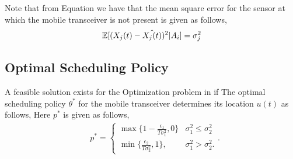 \documentclass[a4paper,english,12pt]{article}
\begin{document}
Note that from Equation  we have that the mean square error  for the sensor at which the mobile transceiver is not present is given as follows,
\begin{align}\label{mse_2}
\mathbb{E}[(X_{j}(t)-\hat{X_{j}(t)})^2|A_i]=\sigma_j^2
\end{align}



\subsection{Optimal Scheduling Policy}
\begin{thm}\label{Placement  Policy}
A feasible solution exists for the Optimization problem in  if
The optimal scheduling policy $\theta^*$ for the mobile transceiver determines its location $u(t)$ as follows, 
    Here $p^*$ is given as follows,
    \begin{align}\label{placement}
    & p^* =\begin{cases}
      \max \{1-\frac{\epsilon_1}{T \sigma_1^2}, 0\} & \sigma_1 ^2\leq \sigma_2^2\\
     \min\{\frac{\epsilon_2}{T \sigma_2^2},1\}, &  \sigma_1^2 > \sigma_2^2.
    \end{cases}.
    \end{align}
\end{thm}
\end{document}
